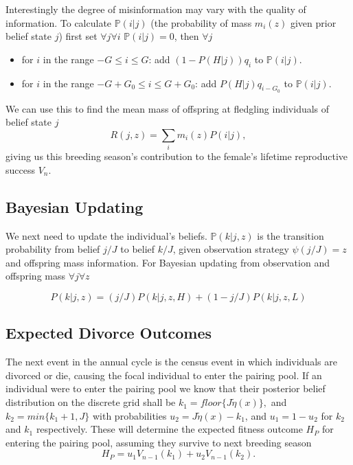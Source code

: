 \documentclass[10pt]{article}
\begin{document}
Interestingly the degree of misinformation may vary with the quality
of information. To calculate $\mathbb{P}(i|j)$ (the probability of
mass $m_{i}(z)$ given prior belief state $j$) first set $\forall j\forall i$
$\mathbb{P}(i|j)=0$, then $\forall j$
\begin{itemize}
	\item for $i$ in the range $-G\leq i\leq G$: add $(1-P(H|j))q_{i}$ to
	$\mathbb{P}(i|j)$.
	\item for $i$ in the range $-G+G_{0}\leq i\leq G+G_{0}$: add $P(H|j)q_{i-G_{0}}$
	to $\mathbb{P}(i|j)$.
\end{itemize}
We can use this to find the mean mass of offspring at fledgling individuals
of belief state $j$
\begin{equation}
	R(j,z)=\underset{i}{\sum}m_{i}(z)P(i|j),\label{eq:-5-2}
\end{equation}
giving us this breeding season's contribution to the female's lifetime
reproductive success $V_{n}$. 

\subsection{Bayesian Updating}

We next need to update the individual's beliefs. $\mathbb{P}(k|j,z)$
is the transition probability from belief $j/J$ to belief $k/J$,
given observation strategy $\psi(j/J)=z$ and offspring mass information.
For Bayesian updating from observation and offspring mass $\forall j\forall z$

\begin{equation}
	P(k|j,z)=(j/J)P(k|j,z,H)+(1-j/J)P(k|j,z,L)\label{eq:-6-1}
\end{equation}


\subsection{Expected Divorce Outcomes}

The next event in the annual cycle is the census event in which individuals
are divorced or die, causing the focal individual to enter the pairing
pool. If an individual were to enter the pairing pool we know that
their posterior belief distribution on the discrete grid shall be
$k_{1}=floor\{J\tilde{\eta}(x)\},$ and $k_{2}=min\{k_{1}+1,J\}$
with probabilities $u_{2}=J\tilde{\eta}(x)-k_{1}$, and $u_{1}=1-u_{2}$
for $k_{2}$ and $k_{1}$ respectively. These will determine the expected
fitness outcome $H_{P}$ for entering the pairing pool, assuming they
survive to next breeding season
\begin{equation}
	H_{P}=u_{1}V_{n-1}(k_{1})+u_{2}V_{n-1}(k_{2}).\label{eq:-4-1-1}
\end{equation}
\end{document}
